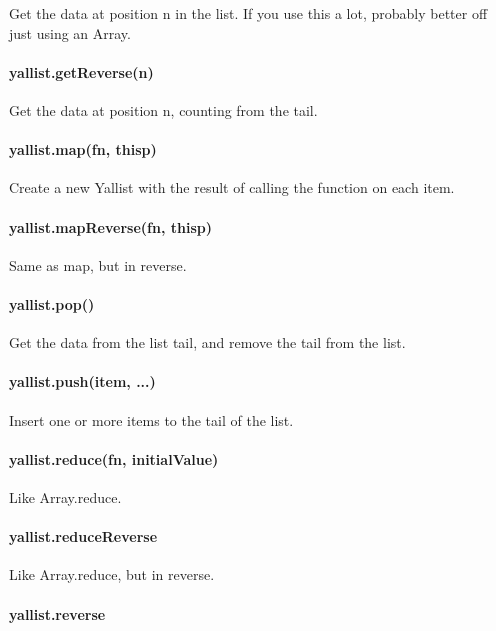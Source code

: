 Get the data at position {\ttfamily n} in the list. If you use this a lot, probably better off just using an Array.

\paragraph*{yallist.\+get\+Reverse(n)}

Get the data at position {\ttfamily n}, counting from the tail.

\paragraph*{yallist.\+map(fn, thisp)}

Create a new Yallist with the result of calling the function on each item.

\paragraph*{yallist.\+map\+Reverse(fn, thisp)}

Same as {\ttfamily map}, but in reverse.

\paragraph*{yallist.\+pop()}

Get the data from the list tail, and remove the tail from the list.

\paragraph*{yallist.\+push(item, ...)}

Insert one or more items to the tail of the list.

\paragraph*{yallist.\+reduce(fn, initial\+Value)}

Like Array.\+reduce.

\paragraph*{yallist.\+reduce\+Reverse}

Like Array.\+reduce, but in reverse.

\paragraph*{yallist.\+reverse}

